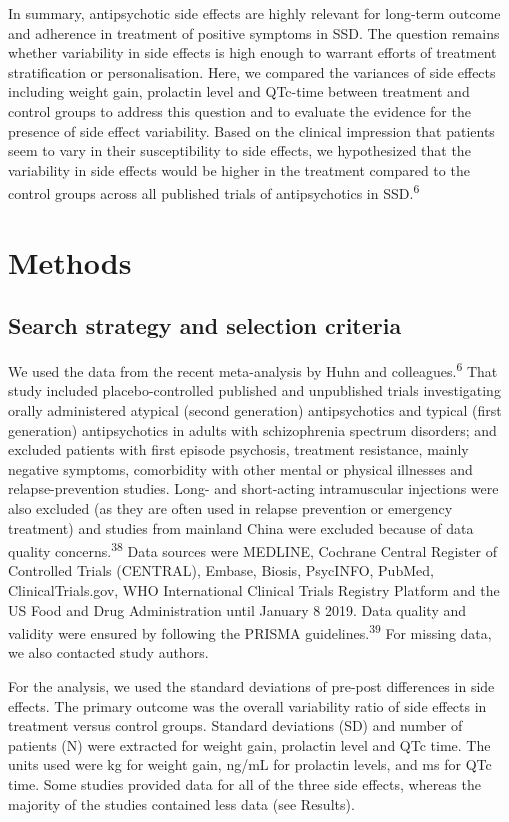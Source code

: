 \documentclass[9pt,english,,jou,floatsintext]{apa6}
\begin{document}
In summary, antipsychotic side effects are highly relevant for long-term
outcome and adherence in treatment of positive symptoms in SSD. The
question remains whether variability in side effects is high enough to
warrant efforts of treatment stratification or personalisation. Here, we
compared the variances of side effects including weight gain, prolactin
level and QTc-time between treatment and control groups to address this
question and to evaluate the evidence for the presence of side effect
variability. Based on the clinical impression that patients seem to vary
in their susceptibility to side effects, we hypothesized that the
variability in side effects would be higher in the treatment compared to
the control groups across all published trials of antipsychotics in
SSD.\textsuperscript{6}

\section{Methods}\label{methods}

\subsection{Search strategy and selection
criteria}\label{search-strategy-and-selection-criteria}

We used the data from the recent meta-analysis by Huhn and
colleagues.\textsuperscript{6} That study included placebo-controlled
published and unpublished trials investigating orally administered
atypical (second generation) antipsychotics and typical (first
generation) antipsychotics in adults with schizophrenia spectrum
disorders; and excluded patients with first episode psychosis, treatment
resistance, mainly negative symptoms, comorbidity with other mental or
physical illnesses and relapse-prevention studies. Long- and
short-acting intramuscular injections were also excluded (as they are
often used in relapse prevention or emergency treatment) and studies
from mainland China were excluded because of data quality
concerns.\textsuperscript{38} Data sources were MEDLINE, Cochrane
Central Register of Controlled Trials (CENTRAL), Embase, Biosis,
PsycINFO, PubMed, ClinicalTrials.gov, WHO International Clinical Trials
Registry Platform and the US Food and Drug Administration until January
8 2019. Data quality and validity were ensured by following the PRISMA
guidelines.\textsuperscript{39} For missing data, we also contacted
study authors.

For the analysis, we used the standard deviations of pre-post
differences in side effects. The primary outcome was the overall
variability ratio of side effects in treatment versus control groups.
Standard deviations (SD) and number of patients (N) were extracted for
weight gain, prolactin level and QTc time. The units used were kg for
weight gain, ng/mL for prolactin levels, and ms for QTc time. Some
studies provided data for all of the three side effects, whereas the
majority of the studies contained less data (see Results).
\end{document}
